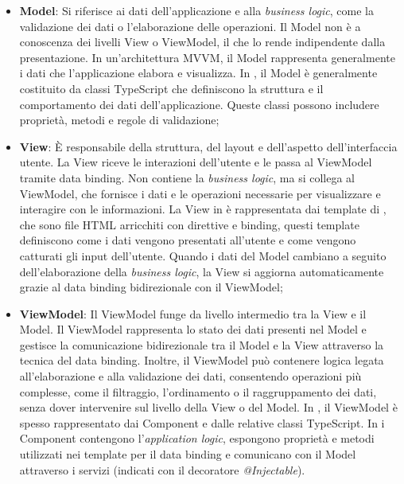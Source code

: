 \begin{itemize}
    \item \textbf{Model}: Si riferisce ai dati dell'applicazione e alla \textit{business logic}, come la validazione dei dati o l'elaborazione delle operazioni. 
    Il Model non è a conoscenza dei livelli View o ViewModel, il che lo rende indipendente dalla presentazione. 
    In un'architettura MVVM, il Model rappresenta generalmente i dati che l'applicazione elabora e visualizza.
    In , il Model è generalmente costituito da classi TypeScript che definiscono la struttura e il comportamento dei dati dell'applicazione. 
    Queste classi possono includere proprietà, metodi e regole di validazione;
    \item \textbf{View}: È responsabile della struttura, del layout e dell'aspetto dell'interfaccia utente. 
    La View riceve le interazioni dell'utente e le passa al ViewModel tramite data binding. 
    Non contiene la \textit{business logic}, ma si collega al ViewModel, che fornisce i dati e le operazioni necessarie per visualizzare e interagire con le informazioni.
    La View in  è rappresentata dai template di , che sono file HTML arricchiti con direttive e binding, questi template definiscono come i dati vengono presentati all'utente e come vengono catturati gli input dell'utente.
    Quando i dati del Model cambiano a seguito dell'elaborazione della \textit{business logic}, la View si aggiorna automaticamente grazie al data binding bidirezionale con il ViewModel;
    \item \textbf{ViewModel}: Il ViewModel funge da livello intermedio tra la View e il Model.
    Il ViewModel rappresenta lo stato dei dati presenti nel Model e gestisce la comunicazione bidirezionale tra il Model e la View attraverso la tecnica del data binding.
    Inoltre, il ViewModel può contenere logica legata all'elaborazione e alla validazione dei dati, consentendo operazioni più complesse, come il filtraggio, l'ordinamento o il raggruppamento dei dati, senza dover intervenire sul livello della View o del Model.
    In , il ViewModel è spesso rappresentato dai Component e dalle relative classi TypeScript. 
    In  i Component contengono l'\textit{application logic}, espongono proprietà e metodi utilizzati nei template per il data binding e comunicano con il Model attraverso i servizi (indicati con il decoratore \textit{@Injectable}). 
\end{itemize}

